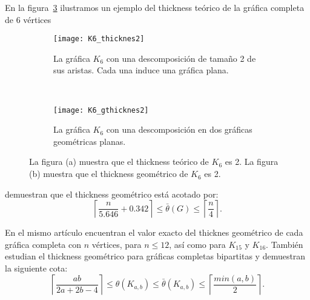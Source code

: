 En la figura~\ref{fig:thicknessexample} ilustramos un ejemplo del thickness teórico de
la gráfica completa de 6 vértices
\begin{figure}[htbp]
  \centering
\begin{subfigure}[h]{.5\textwidth}
  \centering
  \texttt{[image: K6\_thicknes2]}
  \caption{La gráfica $K_6$ con una descomposición de tamaño 2 de sus aristas. Cada una induce una gráfica plana.}
  \label{fig:thk6}
\end{subfigure}%
\\
\begin{subfigure}[h]{.5\textwidth}
  \centering
  \texttt{[image: K6\_gthicknes2]}
  \caption{La gráfica $K_6$ con una descomposición en dos gráficas geométricas planas.}
  \label{fig:gthk6}
\end{subfigure}
\caption{La figura (a) muestra que el thickness teórico de $K_6$ es 2. La figura (b) muestra que el thickness geométrico de $K_6$ es 2.}
\label{fig:thicknessexample}
\end{figure}




\cite{Dillencourt2004} demuestran que el thickness geométrico está acotado por:
\[ \left\lceil \frac{n}{5.646} + 0.342 \right\rceil \leq  \bar{\theta}(G) \leq \left\lceil\frac{n}{4}\right\rceil .\]

En el mismo artículo encuentran el valor exacto del thicknes geométrico
de cada gráfica completa con $n$ vértices, para $n\leq 12$, así como para $K_{15}$ y $K_{16}$.
También estudian el thickness geométrico para gráficas completas bipartitas y demuestran la
siguiente cota:
\[
  \left\lceil \frac{ab}{2a+2b-4} \right\rceil \leq \theta(K_{a,b}) \leq \bar{\theta}(K_{a,b})
  \leq \left\lceil \frac{min(a,b)}{2} \right\rceil.
\]

